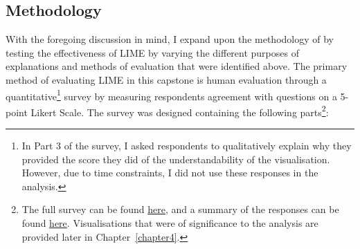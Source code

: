 \subsection{Methodology}
\label{sec:survey_method}
With the foregoing discussion in mind, I expand upon the methodology of \cite{gorski2021} by testing the effectiveness of LIME by varying the different purposes of explanations and methods of evaluation that were identified above. The primary method of evaluating LIME in this capstone is human evaluation through a quantitative\footnote{In Part 3 of the survey, I asked respondents to qualitatively explain why they provided the score they did of the understandability of the visualisation. However, due to time constraints, I did not use these responses in the analysis.} survey by measuring respondents agreement with questions on a 5-point Likert Scale. The survey was designed containing the following parts\footnote{The full survey can be found \href{https://github.com/TristanKoh/capstone-repo/blob/448263a933ae787027298e266f9202e7b3077524/survey/survey_questions.pdf}{here}, and a summary of the responses can be found \href{https://github.com/TristanKoh/capstone-repo/blob/448263a933ae787027298e266f9202e7b3077524/survey/survey_responses.pdf}{here}. Visualisations that were of significance to the analysis are provided later in Chapter~\ref{chapter4}.}:
